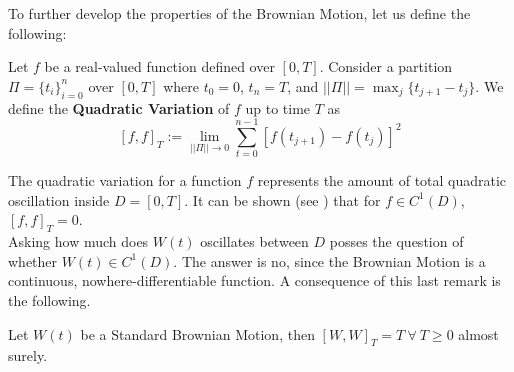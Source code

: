 \documentclass[../TGMAFFIRO]{subfiles}
\begin{document}
To further develop the properties of the Brownian Motion, let us define the following:
\begin{definition}\label{def:quadratic_variation}
	Let $f$ be a real-valued function defined over $[0, T]$. Consider a partition $\Pi= \{t_i\}_{i=0}^{n}$ over $[0, T]$ where $t_0 = 0$, $t_n = T$, and $||\Pi|| = \max_j\{t_{j+1} - t_j\}$. We define the \textbf{Quadratic Variation} of $f$ up to time $T$ as
	\[
		[f, f]_T := \lim_{||\Pi|| \to 0} \sum_{t=0}^{n-1}\left[f(t_{j+1}) - f(t_{j})\right]^2
	\]
\end{definition}


The quadratic variation for a function $f$ represents the amount of total quadratic oscillation inside $D = [0,T]$. It can be shown (see ) that for $f \in C^1(D)$, $[f,f]_T = 0$.\\
	
Asking how much does $W(t)$ oscillates between $D$ posses the question of whether $W(t) \in C^1(D)$. The answer is no, since the Brownian Motion is a continuous, nowhere-differentiable function. A consequence of this last remark is the following.

\begin{theorem}\label{th:quadratic_brownian_motion}
	Let $W(t)$ be a Standard Brownian Motion, then $[W, W]_T = T \ \forall \ T \geq 0$ almost surely.
\end{theorem}
\end{document}

